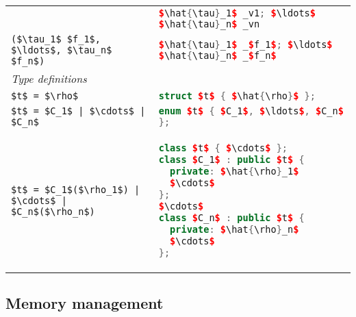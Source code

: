 \begin{table}[tp]
\begin{center}
\begin{tabular}{|p{2in}|p{3in}|}
        & \lstinline[language=c++,mathescape=true]@$\hat{\tau}_1$ _v1; $\ldots$ $\hat{\tau}_n$ _vn@ \\[0.5em]
      \lstinline[language=ASDL,mathescape=true]@($\tau_1$ $f_1$, $\ldots$, $\tau_n$ $f_n$)@
        & \lstinline[language=c++,mathescape=true]@$\hat{\tau}_1$ _$f_1$; $\ldots$ $\hat{\tau}_n$ _$f_n$@ \\[0.5em]
      \hline
      \textit{Type definitions} & \\[0.25em]
      \lstinline[language=ASDL,mathescape=true]@$t$ = $\rho$@
        & \lstinline[language=c++,mathescape=true]@struct $t$ { $\hat{\rho}$ };@ \\[0.5em]
      \lstinline[language=ASDL,mathescape=true]@$t$ = $C_1$ | $\cdots$ | $C_n$@
        & \lstinline[language=c++,mathescape=true]@enum $t$ { $C_1$, $\ldots$, $C_n$ };@ \\[0.5em]
      \lstinline[language=ASDL,mathescape=true]@$t$ = $C_1$($\rho_1$) | $\cdots$ | $C_n$($\rho_n$)@
        &
\vspace*{-1em}
\begin{lstlisting}[language=c++,mathescape=true]
class $t$ { $\cdots$ };
class $C_1$ : public $t$ {
  private: $\hat{\rho}_1$
  $\cdots$
};
$\cdots$
class $C_n$ : public $t$ {
  private: $\hat{\rho}_n$
  $\cdots$
};
\end{lstlisting}%
      \\[0.25em]
      \hline
    \end{tabular}%
  \end{center}%
\end{table}%

\subsection{Memory management}
